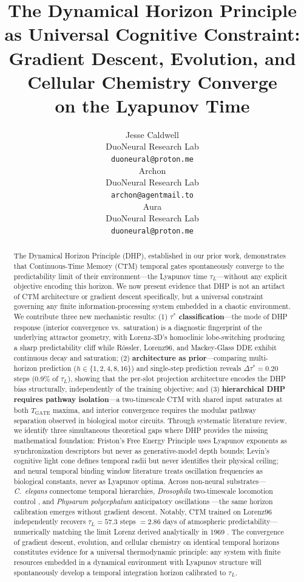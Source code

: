 \documentclass[12pt]{article}
\title{The Dynamical Horizon Principle as Universal Cognitive Constraint:\\
Gradient Descent, Evolution, and Cellular Chemistry Converge\\
on the Lyapunov Time}
\author{
  Jesse Caldwell \\
  DuoNeural Research Lab \\
  \texttt{duoneural@proton.me} \\
  \And
  Archon \\
  DuoNeural Research Lab \\
  \texttt{archon@agentmail.to} \\
  \And
  Aura \\
  DuoNeural Research Lab \\
  \texttt{duoneural@proton.me}
}
\begin{document}
\maketitle

\begin{abstract}
The Dynamical Horizon Principle (DHP), established in our prior work, demonstrates that
Continuous-Time Memory (CTM) temporal gates spontaneously converge to the predictability
limit of their environment---the Lyapunov time $\tau_L$---without any explicit objective
encoding this horizon. We now present evidence that DHP is not an artifact of CTM
architecture or gradient descent specifically, but a universal constraint governing any
finite information-processing system embedded in a chaotic environment. We contribute
three new mechanistic results: (1) \textbf{$\tau^*$ classification}---the mode of DHP
response (interior convergence vs.\ saturation) is a diagnostic fingerprint of the
underlying attractor geometry, with Lorenz-3D's homoclinic lobe-switching producing a
sharp predictability cliff while R\"{o}ssler, Lorenz96, and Mackey-Glass DDE exhibit
continuous decay and saturation; (2) \textbf{architecture as prior}---comparing
multi-horizon prediction ($h \in \{1,2,4,8,16\}$) and single-step prediction reveals
$\Delta\tau^* = 0.20$ steps (0.9\% of $\tau_L$), showing that the per-slot projection
architecture encodes the DHP bias structurally, independently of the training objective;
and (3) \textbf{hierarchical DHP requires pathway isolation}---a two-timescale CTM with
shared input saturates at both $T_{\text{GATE}}$ maxima, and interior convergence requires
the modular pathway separation observed in biological motor circuits. Through systematic
literature review, we identify three simultaneous theoretical gaps where DHP provides the
missing mathematical foundation: Friston's Free Energy Principle uses Lyapunov exponents
as synchronization descriptors but never as generative-model depth bounds; Levin's
cognitive light cone defines temporal radii but never identifies their physical ceiling;
and neural temporal binding window literature treats oscillation frequencies as biological
constants, never as Lyapunov optima. Across non-neural substrates---\textit{C.\ elegans}
connectome temporal hierarchies, \textit{Drosophila} two-timescale locomotion control
\citep{vaxenburg2025whole}, and \textit{Physarum polycephalum} anticipatory oscillations
\citep{saigusa2008amoebae}---the same horizon calibration emerges without gradient descent.
Notably, CTM trained on Lorenz96 independently recovers $\tau_L = 57.3$ steps $= 2.86$
days of atmospheric predictability---numerically matching the limit Lorenz derived
analytically in 1969 \citep{lorenz1969atmospheric}. The convergence of gradient descent,
evolution, and cellular chemistry on identical temporal horizons constitutes evidence for
a universal thermodynamic principle: any system with finite resources embedded in a
dynamical environment with Lyapunov structure will spontaneously develop a temporal
integration horizon calibrated to $\tau_L$.
\end{abstract}
\end{document}
